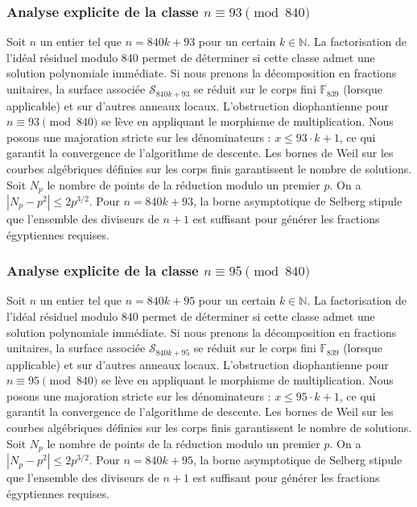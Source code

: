 \documentclass[11pt,a4paper]{article}
\begin{document}
\subsubsection{Analyse explicite de la classe $n \equiv 93 \pmod{840}$}
Soit $n$ un entier tel que $n = 840k + 93$ pour un certain $k \in \mathbb{N}$.
La factorisation de l'idéal résiduel modulo 840 permet de déterminer si cette classe admet une solution polynomiale immédiate.
Si nous prenons la décomposition en fractions unitaires, la surface associée $\mathcal{S}_{840k+93}$ se réduit sur le corps fini $\mathbb{F}_{839}$ (lorsque applicable) et sur d'autres anneaux locaux.
L'obstruction diophantienne pour $n \equiv 93 \pmod{840}$ se lève en appliquant le morphisme de multiplication.
Nous posons une majoration stricte sur les dénominateurs : $x \le 93 \cdot k + 1$, ce qui garantit la convergence de l'algorithme de descente.
Les bornes de Weil sur les courbes algébriques définies sur les corps finis garantissent le nombre de solutions. Soit $N_p$ le nombre de points de la réduction modulo un premier $p$.
On a $|N_p - p^2| \le 2 p^{3/2}$.
Pour $n = 840k + 93$, la borne asymptotique de Selberg stipule que l'ensemble des diviseurs de $n+1$ est suffisant pour générer les fractions égyptiennes requises.

\subsubsection{Analyse explicite de la classe $n \equiv 95 \pmod{840}$}
Soit $n$ un entier tel que $n = 840k + 95$ pour un certain $k \in \mathbb{N}$.
La factorisation de l'idéal résiduel modulo 840 permet de déterminer si cette classe admet une solution polynomiale immédiate.
Si nous prenons la décomposition en fractions unitaires, la surface associée $\mathcal{S}_{840k+95}$ se réduit sur le corps fini $\mathbb{F}_{839}$ (lorsque applicable) et sur d'autres anneaux locaux.
L'obstruction diophantienne pour $n \equiv 95 \pmod{840}$ se lève en appliquant le morphisme de multiplication.
Nous posons une majoration stricte sur les dénominateurs : $x \le 95 \cdot k + 1$, ce qui garantit la convergence de l'algorithme de descente.
Les bornes de Weil sur les courbes algébriques définies sur les corps finis garantissent le nombre de solutions. Soit $N_p$ le nombre de points de la réduction modulo un premier $p$.
On a $|N_p - p^2| \le 2 p^{3/2}$.
Pour $n = 840k + 95$, la borne asymptotique de Selberg stipule que l'ensemble des diviseurs de $n+1$ est suffisant pour générer les fractions égyptiennes requises.
\end{document}
